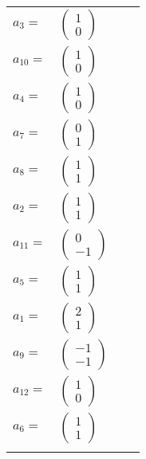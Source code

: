 \documentclass[1p]{elsarticle_modified}
\theoremstyle{definition}
\begin{document}
\begin{tabular}{m{7pt} m{180pt} m{7pt} m{180pt} }
\flushright $a_{3}=$&$\begin{pmatrix}1\\0\end{pmatrix}$ \\
\flushright $a_{10}=$&$\begin{pmatrix}1\\0\end{pmatrix}$ \\
\flushright $a_{4}=$&$\begin{pmatrix}1\\0\end{pmatrix}$ \\
\flushright $a_{7}=$&$\begin{pmatrix}0\\1\end{pmatrix}$ \\
\flushright $a_{8}=$&$\begin{pmatrix}1\\1\end{pmatrix}$ \\
\flushright $a_{2}=$&$\begin{pmatrix}1\\1\end{pmatrix}$ \\
\flushright $a_{11}=$&$\begin{pmatrix}0\\-1\end{pmatrix}$ \\
\flushright $a_{5}=$&$\begin{pmatrix}1\\1\end{pmatrix}$ \\
\flushright $a_{1}=$&$\begin{pmatrix}2\\1\end{pmatrix}$ \\
\flushright $a_{9}=$&$\begin{pmatrix}-1\\-1\end{pmatrix}$ \\
\flushright $a_{12}=$&$\begin{pmatrix}1\\0\end{pmatrix}$ \\
\flushright $a_{6}=$&$\begin{pmatrix}1\\1\end{pmatrix}$\\&\end{tabular}
\end{document}
